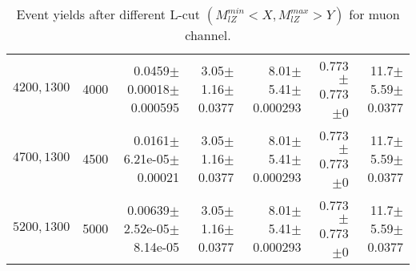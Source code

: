 \documentclass[]{article}
\begin{document}
\begin{table}
\begin{center}
{\begin{tabular}{ |r|r|r|r|r|r|r|}
$4200,1300$ & 4000 & 0.0459$\pm$0.00018$\pm$0.000595 & 3.05$\pm$1.16$\pm$0.0377 & 8.01$\pm$5.41$\pm$0.000293 & 0.773$\pm$0.773$\pm$0 & 11.7$\pm$5.59$\pm$0.0377 \\
$4700,1300$ & 4500 & 0.0161$\pm$6.21e-05$\pm$0.00021 & 3.05$\pm$1.16$\pm$0.0377 & 8.01$\pm$5.41$\pm$0.000293 & 0.773$\pm$0.773$\pm$0 & 11.7$\pm$5.59$\pm$0.0377 \\
$5200,1300$ & 5000 & 0.00639$\pm$2.52e-05$\pm$8.14e-05 & 3.05$\pm$1.16$\pm$0.0377 & 8.01$\pm$5.41$\pm$0.000293 & 0.773$\pm$0.773$\pm$0 & 11.7$\pm$5.59$\pm$0.0377 \\
\hline 
\end{tabular}
}
\end{center}
\caption{Event yields after different L-cut $(M_{lZ}^{min} < X, M_{lZ}^{max} > Y)$ for muon channel.}
\end{table}
\end{document}

